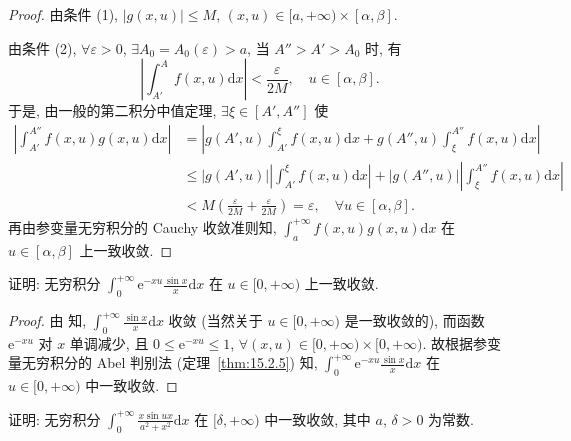 \begin{proof}
由条件 (1), $|g(x,u)|\leqslant M$, $(x,u)\in[a,+\infty)\times[\alpha,\beta]$.

由条件 (2), $\forall\varepsilon>0$, $\exists A_{0}=A_{0}(\varepsilon)>a$, 当 $A''>A'>A_{0}$ 时, 有
\[
  \left|\int_{A'}^{A}f(x,u)\mathrm{d}x\right|<\frac{\varepsilon}{2M},\quad u\in[\alpha,\beta].
\]
于是, 由一般的第二积分中值定理, $\exists\xi\in[A',A'']$ 使
\[
  \begin{aligned}
    \left|\int_{A'}^{A''}f(x,u)g(x,u)\mathrm{d}x\right|
    &=\left|g(A',u)\int_{A'}^{\xi}f(x,u)\mathrm{d}x+g(A'',u)\int_{\xi}^{A''}f(x,u)\mathrm{d}x\right|\\
    &\leqslant|g(A',u)|\left|\int_{A'}^{\xi}f(x,u)\mathrm{d}x\right|+|g(A'',u)|\left|\int_{\xi}^{A''}f(x,u)\mathrm{d}x\right|\\
    &<M\left(\frac{\varepsilon}{2M}+\frac{\varepsilon}{2M}\right)=\varepsilon,\quad\forall u\in[\alpha,\beta].
  \end{aligned}
\]
再由参变量无穷积分的 Cauchy 收敛准则知, $\displaystyle\int_{a}^{+\infty}f(x,u)g(x,u)\mathrm{d}x$ 在 $u\in[\alpha,\beta]$ 上一致收敛.
\end{proof}

\begin{example}\label{ex:15.2.5}
证明: 无穷积分 $\displaystyle\int_{0}^{+\infty}\mathrm{e}^{-xu}\frac{\sin x}{x}\mathrm{d}x$ 在 $u\in[0,+\infty)$ 上一致收敛.
\end{example}

\begin{proof}
由 知, $\displaystyle\int_{0}^{+\infty}\frac{\sin x}{x}\mathrm{d}x$ 收敛 (当然关于 $u\in[0,+\infty)$ 是一致收敛的), 而函数 $\mathrm{e}^{-xu}$ 对 $x$ 单调减少, 且 $0\leqslant\mathrm{e}^{-xu}\leqslant1$, $\forall(x,u)\in[0,+\infty)\times[0,+\infty)$. 故根据参变量无穷积分的 Abel 判别法 (定理~\ref{thm:15.2.5}) 知, $\displaystyle\int_{0}^{+\infty}\mathrm{e}^{-xu}\frac{\sin x}{x}\mathrm{d}x$ 在 $u\in[0,+\infty)$ 中一致收敛.
\end{proof}

\begin{example}\label{ex:15.2.6}
证明: 无穷积分 $\displaystyle\int_{0}^{+\infty}\frac{x\sin ux}{a^{2}+x^{2}}\mathrm{d}x$ 在 $[\delta,+\infty)$ 中一致收敛, 其中 $a$, $\delta>0$ 为常数.
\end{example}

